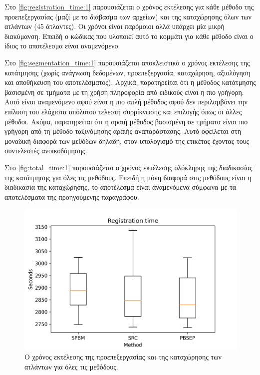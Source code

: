 \documentclass[a4paper,12pt]{article}
\begin{document}
Στο \autoref{fig:registration_time:1} παρουσιάζεται ο χρόνος εκτέλεσης για κάθε
μέθοδο της προεπεξεργασίας (μαζί με το διάβασμα των αρχείων) και της καταχώρησης
όλων των ατλάντων (45 άτλαντες). Οι χρόνοι είναι παρόμοιοι αλλά υπάρχει μία
μικρή διακύμανση. Επειδή ο κώδικας που υλοποιεί αυτό το κομμάτι για κάθε μέθοδο
είναι ο ίδιος το αποτέλεσμα είναι αναμενόμενο.

Στο \autoref{fig:segmentation_time:1} παρουσιάζεται αποκλειστικά ο χρόνος
εκτέλεσης της κατάτμησης (χωρίς ανάγνωση δεδομένων, προεπεξεργασία, καταχώρηση,
αξιολόγηση και αποθήκευση του αποτελέσματος). Αρχικά, παρατηρείται ότι η μέθοδος
κατάτμησης βασισμένη σε τμήματα με τη χρήση πληροφορία από ειδικούς είναι η πιο
γρήγορη. Αυτό είναι αναμενόμενο αφού είναι η πιο απλή μέθοδος αφού δεν
περιλαμβάνει την επίλυση του ελάχιστα απόλυτου τελεστή συρρίκνωσης και επιλογής
όπως οι άλλες μέθοδοι. Ακόμα, παρατηρείται ότι η αραιή μέθοδος βασισμένη σε
τμήματα είναι πιο γρήγορη από τη μέθοδο ταξινόμησης αραιής αναπαράστασης. Αυτό
οφείλεται στη μοναδική διαφορά των μεθόδων δηλαδή, στον υπολογισμό της ετικέτας
έχοντας τους συντελεστές ανοικοδόμησης.

Στο \autoref{fig:total_time:1} παρουσιάζεται ο χρόνος εκτέλεσης ολόκληρης της
διαδικασίας της κατάτμησης για όλες τις μεθόδους. Επειδή η μόνη διαφορά στις
μεθόδους είναι η διαδικασία της καταχώρησης, το αποτέλεσμα είναι αναμενόμενα
σύμφωνα με τα αποτελέσματα της προηγούμενης παραγράφου.


\begin{figure}[H]
    \centering
    \includegraphics[width=0.85\linewidth]{Registration_time_plot.png}
    \caption{Ο χρόνος εκτέλεσης της προεπεξεργασίας και της καταχώρησης των
             ατλάντων για όλες τις μεθόδους.}
    \label{fig:registration_time:1}
\end{figure}
\end{document}
